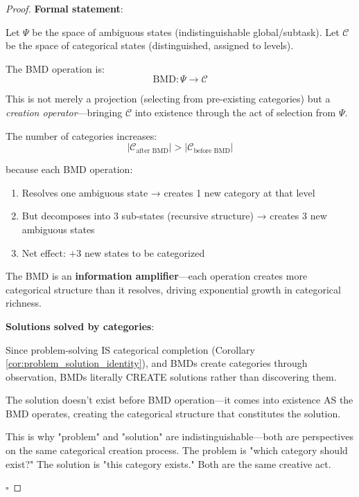\documentclass[12pt,a4paper]{article}
\begin{document}
\begin{proof}
\textbf{Formal statement}:

Let $\Psi$ be the space of ambiguous states (indistinguishable global/subtask).
Let $\mathcal{C}$ be the space of categorical states (distinguished, assigned to levels).

The BMD operation is:
\begin{equation}
\text{BMD}: \Psi \to \mathcal{C}
\end{equation}

This is not merely a projection (selecting from pre-existing categories) but a \textit{creation operator}—bringing $\mathcal{C}$ into existence through the act of selection from $\Psi$.

The number of categories increases:
\begin{equation}
|\mathcal{C}_{\text{after BMD}}| > |\mathcal{C}_{\text{before BMD}}|
\end{equation}

because each BMD operation:
\begin{enumerate}
\item Resolves one ambiguous state → creates 1 new category at that level
\item But decomposes into 3 sub-states (recursive structure) → creates 3 new ambiguous states
\item Net effect: $+3$ new states to be categorized
\end{enumerate}

The BMD is an \textbf{information amplifier}—each operation creates more categorical structure than it resolves, driving exponential growth in categorical richness.

\textbf{Solutions solved by categories}:

Since problem-solving IS categorical completion (Corollary \ref{cor:problem_solution_identity}), and BMDs create categories through observation, BMDs literally CREATE solutions rather than discovering them.

The solution doesn't exist before BMD operation—it comes into existence AS the BMD operates, creating the categorical structure that constitutes the solution.

This is why "problem" and "solution" are indistinguishable—both are perspectives on the same categorical creation process. The problem is "which category should exist?" The solution is "this category exists." Both are the same creative act.

$\square$
\end{proof}
\end{document}
